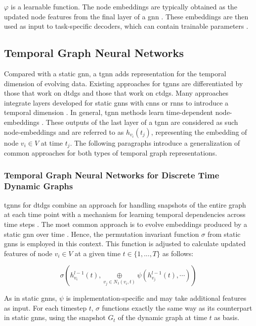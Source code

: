 $\varphi$ is a learnable function. The node embeddings are typically obtained as the updated node features from the final layer of a \gls{gnn} \cite{hamilton_representation_2017}. These embeddings are then used as input to task-specific decoders, which can contain trainable parameters \cite{hamilton_representation_2017}.

\subsection{Temporal Graph Neural Networks}
\label{s_Background_TGNNs}

Compared with a static \gls{gnn}, a \gls{tgnn} adds representation for the temporal dimension of evolving data. Existing approaches for \glspl{tgnn} are differentiated by those that work on \glspl{dtdg} and those that work on \glspl{ctdg}. Many approaches integrate layers developed for static \glspl{gnn} with \glspl{cnn} or \glspl{rnn} to introduce a temporal dimension \cite{wu_comprehensive_2021}. In general, \gls{tgnn} methods learn time-dependent node-embeddings \cite{longa_graph_2023}. These outputs of the last layer of a \gls{tgnn} are considered as such node-embeddings and are referred to as $h_{v_i}(t_j)$, representing the embedding of node $v_i \in V$ at time $t_j$. The following paragraphs introduce a generalization of common approaches for both types of temporal graph representations.

\subsubsection{Temporal Graph Neural Networks for Discrete Time Dynamic Graphs}
\label{s_tgnns_for_dtdgs}
\glspl{tgnn} for \glspl{dtdg} combine an approach for handling snapshots of the entire graph at each time point with a mechanism for learning temporal dependencies across time steps \cite{longa_graph_2023}. The most common approach is to evolve embeddings produced by a static \gls{gnn} over time \cite{longa_graph_2023}. Hence, the permutation invariant function $\sigma$ from static \glspl{gnn} is employed in this context. This function is adjusted to calculate updated features of node $v_i \in V$ at a given time $t \in \{1,...,T\}$ as follows:

\begin{equation}
    \sigma(h_{v_i}^{l-1}(t), \underset{v_j \in N_1(v_i, t)}{\oplus} \psi(h_{v_j}^{l-1}(t), \cdots))
\end{equation}

As in static \glspl{gnn}, $\psi$ is implementation-specific and may take additional features as input. For each timestep $t$, $\sigma$ functions exactly the same way as its counterpart in static \glspl{gnn}, using the snapshot $G_t$ of the dynamic graph at time $t$ as basis.

